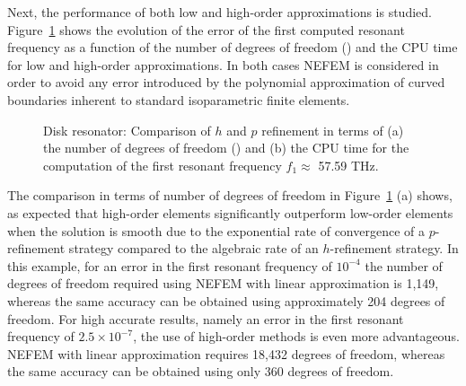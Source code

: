 Next, the performance of both low and high-order approximations is studied. Figure~\ref{fig:circleHvsP} shows the evolution of the error of the first computed resonant frequency as a function of the number of degrees of freedom (\ndof) and the CPU time for low and high-order approximations. In both cases NEFEM is considered in order to avoid any error introduced by the polynomial approximation of curved boundaries inherent to standard isoparametric finite elements.
\begin{figure}[!ht]
	\centering
	\caption{Disk resonator: Comparison of $h$ and $p$ refinement in terms of (a) the number of degrees of freedom (\ndof) and (b) the CPU time for the computation of the first resonant frequency $f_1 \approx$ 57.59 THz.}
	\label{fig:circleHvsP}
\end{figure}

The comparison in terms of number of degrees of freedom in Figure~\ref{fig:circleHvsP} (a) shows, as expected that high-order elements significantly outperform low-order elements when the solution is smooth due to the exponential rate of convergence of a $p$-refinement strategy compared to the algebraic rate of an $h$-refinement strategy. In this example, for an error in the first resonant frequency of $10^{-4}$ the number of degrees of freedom required using NEFEM with linear approximation is 1,149, whereas the same accuracy can be obtained using approximately 204 degrees of freedom. For high accurate results, namely an error in the first resonant frequency of $2.5 \times 10^{-7}$, the use of high-order methods is even more advantageous. NEFEM with linear approximation requires 18,432 degrees of freedom, whereas the same accuracy can be obtained using only 360 degrees of freedom. 

